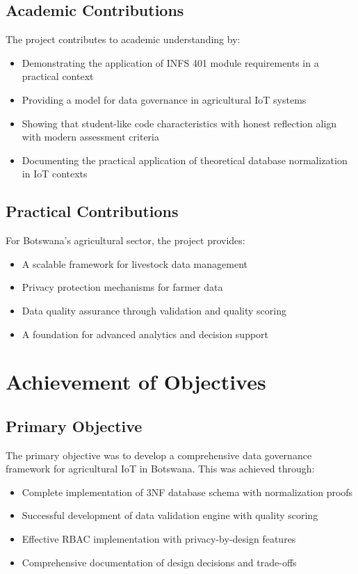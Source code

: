 \subsection{Academic Contributions}

The project contributes to academic understanding by:

\begin{itemize}
    \item Demonstrating the application of INFS 401 module requirements in a practical context
    \item Providing a model for data governance in agricultural IoT systems
    \item Showing that student-like code characteristics with honest reflection align with modern assessment criteria
    \item Documenting the practical application of theoretical database normalization in IoT contexts
\end{itemize}

\subsection{Practical Contributions}

For Botswana's agricultural sector, the project provides:

\begin{itemize}
    \item A scalable framework for livestock data management
    \item Privacy protection mechanisms for farmer data
    \item Data quality assurance through validation and quality scoring
    \item A foundation for advanced analytics and decision support
\end{itemize}

\section{Achievement of Objectives}

\subsection{Primary Objective}

The primary objective was to develop a comprehensive data governance framework for agricultural IoT in Botswana. This was achieved through:

\begin{itemize}
    \item Complete implementation of 3NF database schema with normalization proofs
    \item Successful development of data validation engine with quality scoring
    \item Effective RBAC implementation with privacy-by-design features
    \item Comprehensive documentation of design decisions and trade-offs
\end{itemize}

